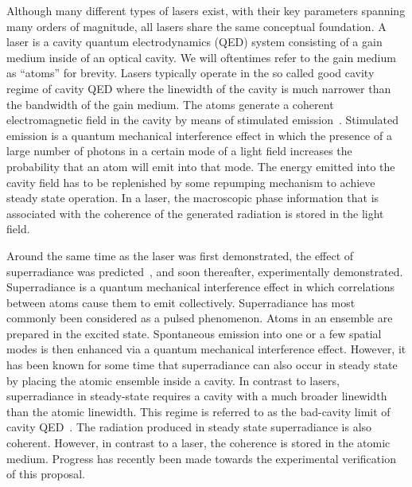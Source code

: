 \documentclass[aps,prl,twocolumn,
superscriptaddress,groupedaddress]{revtex4}
\begin{document}
Although many different types of lasers exist, with their key
parameters spanning many orders of magnitude, all lasers share the
same conceptual foundation.  A laser is a cavity quantum
electrodynamics (QED) system consisting of a gain medium inside of an
optical cavity.  We will oftentimes refer to the gain medium as
``atoms'' for brevity.  Lasers typically operate in the so called good
cavity regime of cavity QED where the linewidth of the cavity is much
narrower than the bandwidth of the gain medium.  The atoms generate a
coherent electromagnetic field in the cavity by means of stimulated
emission~\cite{PhysRev.112.1940}. Stimulated emission is a quantum
mechanical interference effect in which the presence of a large number
of photons in a certain mode of a light field increases the
probability that an atom will emit into that mode. The energy emitted
into the cavity field has to be replenished by some repumping
mechanism to achieve steady state operation. In a laser, the
macroscopic phase information that is associated with the coherence of
the generated radiation is stored in the light field.

Around the same time as the laser was first demonstrated, the effect
of superradiance was predicted~\cite{PhysRev.93.99}, and soon
thereafter, experimentally demonstrated.  Superradiance is a quantum
mechanical interference effect in which correlations between atoms
cause them to emit collectively.  Superradiance has most commonly been
considered as a pulsed phenomenon.  Atoms in an ensemble are prepared
in the excited state.  Spontaneous emission into one or a few spatial
modes is then enhanced via a quantum mechanical interference effect.
However, it has been known for some time that superradiance can also
occur in steady state~\cite{PhysRevLett.102.163601,
  PhysRevA.81.033847, PhysRevA.81.063827,PhysRevLett.89.253003} by
placing the atomic ensemble inside a cavity.  In contrast to lasers,
superradiance in steady-state requires a cavity with a much broader
linewidth than the atomic linewidth.  This regime is referred to as
the bad-cavity limit of cavity QED~\cite{PhysRevA.51.809,
  PhysRevLett.72.3815, ChenDeliciousLaser, HakenLaser,
  HakenLaserBook}.  The radiation produced in steady state
superradiance is also coherent.  However, in contrast to a laser, the
coherence is stored in the atomic medium.  Progress has recently been
made towards the experimental verification~\cite{ThompsonPaper} of
this proposal.
\end{document}
